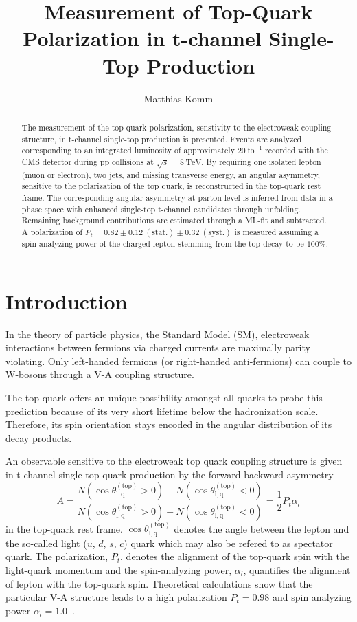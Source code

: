 \documentclass[a4paper]{jpconf}
\newcommand{\unit}[1]{\ensuremath{\mathrm{~#1}}}
\newcommand{\particle}[1]{\ensuremath{#1}}
\newcommand{\costheta}[0]{\cos\theta_{\mathrm{l,q}}^{\mathrm{(top)}}}
\begin{document}
\title{Measurement of Top-Quark Polarization in t-channel Single-Top Production}

\author{Matthias Komm}

\address{Centre for Cosmology, Particle Physics and Phenomenology, Universit\'e catholique de Louvain, 1348 Louvain-la-Neuve, Belgium}


\begin{abstract}
The measurement of the top quark polarization, senstivity to the electroweak coupling structure, in t-channel single-top production is presented. Events are analyzed corresponding to an integrated luminosity of approximately $20\unit{fb^{-1}}$ recorded with the CMS detector during pp collisions at $\sqrt{s}=8\unit{TeV}$. By requiring one isolated lepton (muon or electron), two jets, and missing transverse energy, an angular asymmetry, sensitive to the  polarization of the top quark, is reconstructed in the top-quark rest frame. The corresponding angular asymmetry at parton level is inferred from data in a phase space with enhanced single-top t-channel candidates through unfolding. Remaining background contributions are estimated through a ML-fit and subtracted. A polarization of $P_{t}=0.82\pm0.12\mathrm{~(stat.)}\pm0.32\mathrm{~(syst.)}$ is measured assuming a spin-analyzing power of the charged lepton stemming from the top decay to be $100\%$.
\end{abstract}

\section{Introduction}
In the theory of particle physics, the Standard Model (SM), electroweak interactions between fermions via charged currents are maximally parity violating. Only left-handed fermions (or right-handed anti-fermions) can couple to W-bosons through a V-A coupling structure.


The top quark offers an unique possibility amongst all quarks to probe this prediction because of its very short lifetime below the hadronization scale. Therefore, its spin orientation stays encoded in the angular distribution of its decay products.


An observable sensitive to the electroweak top quark coupling structure is given in t-channel single top-quark production by the forward-backward asymmetry
\begin{equation}
A=\frac{N(\costheta>0)-N(\costheta<0)}{N(\costheta>0)+N(\costheta<0)}=\frac{1}{2}P_{t}\alpha_{l}
\end{equation}
in the top-quark rest frame. $\costheta$ denotes the angle between the lepton and the so-called light ($\particle{u}$, $\particle{d}$, $\particle{s}$, $\particle{c}$) quark which may also be refered to as spectator quark. The polarization, $P_{t}$, denotes the alignment of the top-quark spin with the light-quark momentum and the spin-analyzing power, $\alpha_{l}$, quantifies the alignment of lepton with the top-quark spin. Theoretical calculations show that the particular V-A structure leads to a high polarization $P_{t}=0.98$ and spin analyzing power $\alpha_{l}=1.0$~\cite{bernreuther}.
\end{document}
